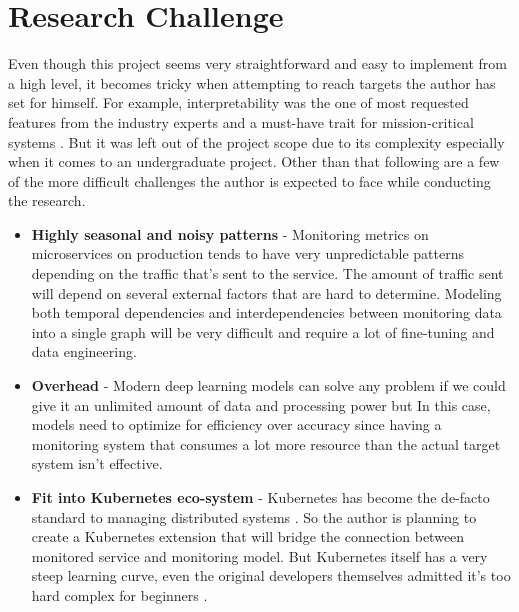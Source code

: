 \section{Research Challenge}

Even though this project seems very straightforward and easy to implement from a high level, it becomes tricky when attempting to reach targets the author has set for himself. For example, interpretability was the one of most requested features from the industry experts and a must-have trait for mission-critical systems \citep{ribeiro2016should}. But it was left out of the project scope due to its complexity especially when it comes to an undergraduate project. Other than that following are a few of the more difficult challenges the author is expected to face while conducting the research.

\begin{itemize}[leftmargin=*] 
\item \textbf{Highly seasonal and noisy patterns} - Monitoring metrics on microservices on production tends to have very unpredictable patterns depending on the traffic that's sent to the service. The amount of traffic sent will depend on several external factors that are hard to determine. Modeling both temporal dependencies and interdependencies between monitoring data into a single graph will be very difficult and require a lot of fine-tuning and data engineering.
\item \textbf{Overhead} - Modern deep learning models can solve any problem if we could give it an unlimited amount of data and processing power but In this case, models need to optimize for efficiency over accuracy since having a monitoring system that consumes a lot more resource than the actual target system isn't effective.
\item \textbf{Fit into Kubernetes eco-system} - Kubernetes has become the de-facto standard to managing distributed systems \citep{WhatisCo78:online}. So the author is planning to create a Kubernetes extension that will bridge the connection between monitored service and monitoring model. But Kubernetes itself has a very steep learning curve, even the original developers themselves admitted it's too hard complex for beginners \cite{Googlead4:online}.
\end{itemize}

